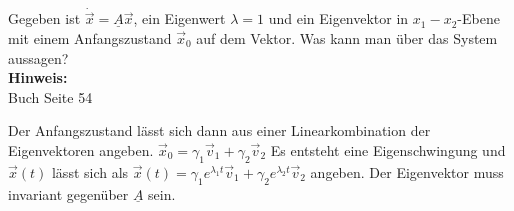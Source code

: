 \begin{question}[section=2,name={Anfangszustand},difficulty=3,type=mdl,tags={}]
	Gegeben ist $\dot{\vec x} = \underline A \vec x$, ein Eigenwert $\lambda = 1$ und ein Eigenvektor in $x_1-x_2$-Ebene mit einem Anfangszustand $\vec x_0$ auf dem Vektor. Was kann man über das System aussagen?
	\\ \textbf{Hinweis:}\\
	Buch Seite 54
\end{question}
\begin{solution}
	Der Anfangszustand lässt sich dann aus einer Linearkombination der Eigenvektoren angeben.
	$\vec x_0 = \gamma_1 \vec v_1+\gamma_2 \vec v_2$
	Es entsteht eine Eigenschwingung und $\vec x (t)$ lässt sich  als $\vec x (t)=\gamma_1 e^{\lambda_1 t} \vec v_1 + \gamma_2 e^{\lambda_2 t} \vec v_2$ angeben. Der Eigenvektor muss invariant gegenüber $\underline A$ sein.
\end{solution}